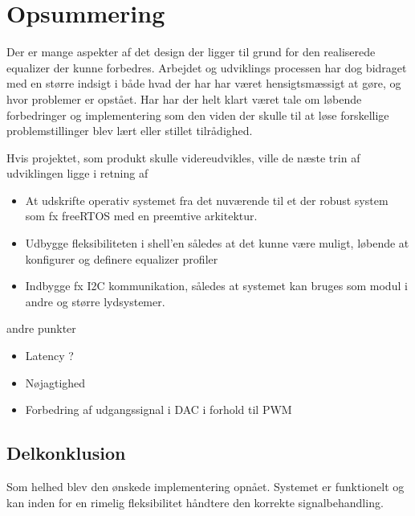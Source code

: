 \section{Opsummering}
Der er mange aspekter af det design der ligger til grund for den realiserede equalizer der kunne forbedres.
Arbejdet og udviklings processen har dog bidraget med en større indsigt i både hvad der har har været hensigtsmæssigt at gøre, og hvor problemer er opstået.
Har har der helt klart været tale om løbende forbedringer og implementering som den viden der skulle til at løse forskellige problemstillinger blev lært eller stillet tilrådighed.\\

Hvis projektet, som produkt skulle videreudvikles, ville de næste trin af udviklingen ligge i retning af
\begin{itemize}
	\item At udskrifte operativ systemet fra det nuværende til et der robust system som fx freeRTOS med en preemtive arkitektur.
	\item Udbygge fleksibiliteten i shell'en således at det kunne være muligt, løbende at konfigurer og definere equalizer profiler
	\item Indbygge fx I2C kommunikation, således at systemet kan bruges som modul i andre og større lydsystemer.
\end{itemize} 

andre punkter
\begin{itemize}
	\item Latency ?
	\item Nøjagtighed
	\item Forbedring af udgangssignal i DAC i forhold til PWM
\end{itemize}

\subsection{Delkonklusion}
Som helhed blev den ønskede implementering opnået.
Systemet er funktionelt og kan inden for en rimelig fleksibilitet håndtere den korrekte signalbehandling.

